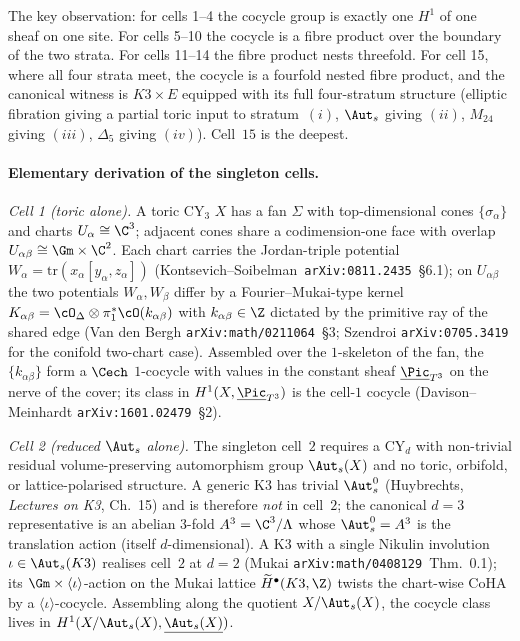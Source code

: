 \noindent The key observation: for cells 1--4 the cocycle group is
exactly one $H^{1}$ of one sheaf on one site. For cells 5--10 the
cocycle is a fibre product over the boundary of the two strata. For
cells 11--14 the fibre product nests threefold. For cell 15, where
all four strata meet, the cocycle is a fourfold nested fibre product,
and the canonical witness is $K3\times E$ equipped with its full
four-stratum structure (elliptic fibration giving a partial toric
input to stratum~$(i)$, $\Aut_{s}$ giving $(ii)$, $M_{24}$ giving
$(iii)$, $\Delta_{5}$ giving $(iv)$). Cell~$15$ is the deepest.

\paragraph{Elementary derivation of the singleton cells.}

\emph{Cell 1 (toric alone).} A toric CY$_{3}$ $X$ has a fan $\Sigma$
with top-dimensional cones $\{\sigma_{\alpha}\}$ and charts
$U_{\alpha}\cong\C^{3}$; adjacent cones share a codimension-one face
with overlap $U_{\alpha\beta}\cong\Gm\times\C^{2}$. Each chart carries
the Jordan-triple potential $W_{\alpha}=\mathrm{tr}(x_{\alpha}[y_{\alpha},
z_{\alpha}])$ (Kontsevich--Soibelman~\texttt{arXiv:0811.2435}~\S 6.1);
on $U_{\alpha\beta}$ the two potentials $W_{\alpha}, W_{\beta}$ differ
by a Fourier--Mukai-type kernel
$K_{\alpha\beta}=\cO_{\Delta}\otimes\pi_{1}^{*}\cO(k_{\alpha\beta})$
with $k_{\alpha\beta}\in\Z$ dictated by the primitive ray of the shared
edge (Van den Bergh \texttt{arXiv:math/0211064}~\S 3; Szendroi
\texttt{arXiv:0705.3419} for the conifold two-chart case). Assembled
over the $1$-skeleton of the fan, the $\{k_{\alpha\beta}\}$ form a
$\Cech$ $1$-cocycle with values in the constant sheaf
$\underline{\Pic}_{T^{3}}$ on the nerve of the cover; its class in
$H^{1}(X,\underline{\Pic}_{T^{3}})$ is the cell-$1$ cocycle
(Davison--Meinhardt \texttt{arXiv:1601.02479}~\S 2).

\emph{Cell 2 (reduced $\Aut_{s}$ alone).} The singleton cell~$2$
requires a CY$_{d}$ with non-trivial residual volume-preserving
automorphism group $\Aut_{s}(X)$ and no toric, orbifold, or
lattice-polarised structure. A generic K3 has trivial $\Aut_{s}^{0}$
(Huybrechts, \emph{Lectures on K3}, Ch.~15) and is therefore \emph{not}
in cell~$2$; the canonical $d = 3$ representative is an abelian
3-fold $A^{3} = \C^{3}/\Lambda$ whose $\Aut_{s}^{0} = A^{3}$ is the
translation action (itself $d$-dimensional). A K3 with a single
Nikulin involution $\iota \in \Aut_{s}(K3)$ realises cell~$2$ at
$d = 2$ (Mukai \texttt{arXiv:math/0408129}~Thm.~0.1); its
$\Gm\times\langle\iota\rangle$-action on the Mukai lattice
$\widetilde H^{\bullet}(K3,\Z)$ twists the chart-wise CoHA by a
$\langle\iota\rangle$-cocycle. Assembling along the quotient
$X/\Aut_{s}(X)$, the cocycle class lives in
$H^{1}(X/\Aut_{s}(X),\underline{\Aut_{s}(X)})$.

